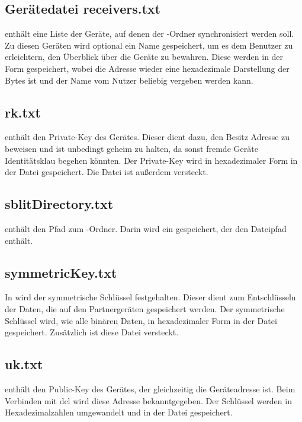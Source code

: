 \subsection{Gerätedatei receivers.txt} \label{receivers}
 enthält eine Liste der Geräte, auf denen der \sblit-Ordner synchronisiert werden soll. Zu diesen Geräten wird optional ein Name gespeichert, um es dem Benutzer zu erleichtern, den Überblick über die Geräte zu bewahren. Diese werden in der Form  gespeichert, wobei die Adresse wieder eine hexadezimale Darstellung der Bytes ist und der Name vom Nutzer beliebig vergeben werden kann.

\subsection{rk.txt}
 enthält den Private-Key des Gerätes. Dieser dient dazu, den Besitz Adresse zu beweisen und ist unbedingt geheim zu halten, da sonst fremde Geräte Identitätsklau begehen könnten. Der Private-Key wird in hexadezimaler Form in der Datei gespeichert. Die Datei ist außerdem versteckt.

\subsection{sblitDirectory.txt}
 enthält den Pfad zum \sblit-Ordner. Darin wird ein  gespeichert, der den Dateipfad enthält. 

\subsection{symmetricKey.txt} \label{symmetricKey}
In  wird der symmetrische Schlüssel festgehalten. Dieser dient zum Entschlüsseln der Daten, die auf den Partnergeräten gespeichert werden. Der symmetrische Schlüssel wird, wie alle binären Daten, in hexadezimaler Form in der Datei gespeichert. Zusätzlich ist diese Datei versteckt.

\subsection{uk.txt}
 enthält den Public-Key des Gerätes, der gleichzeitig die Geräteadresse ist. Beim Verbinden mit \gls{dcl} wird diese Adresse bekanntgegeben. Der Schlüssel werden in Hexadezimalzahlen umgewandelt und in der Datei gespeichert.
